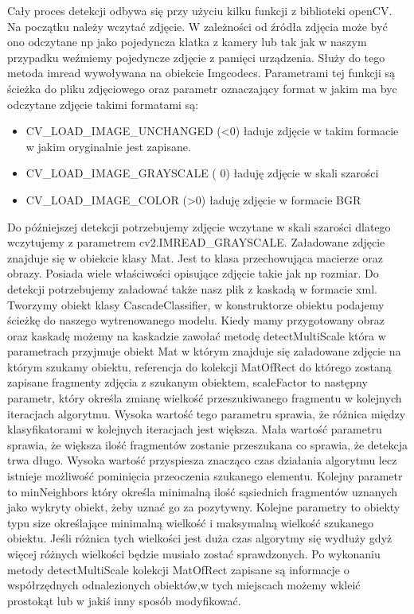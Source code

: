 Cały proces detekcji odbywa się przy użyciu kilku funkcji z biblioteki openCV. Na początku należy wczytać zdjęcie. W zależności od źródła zdjęcia może być ono odczytane np jako pojedyncza klatka z kamery lub tak jak w naszym przypadku weźmiemy pojedyncze zdjęcie z pamięci urządzenia. Służy do tego metoda imread wywoływana na obiekcie Imgcodecs. Parametrami tej funkcji są ścieżka do pliku zdjęciowego oraz parametr oznaczający format w jakim ma byc odczytane zdjęcie takimi formatami są:
\begin{itemize}
    \item CV\_LOAD\_IMAGE\_UNCHANGED (\textless0) ładuje zdjęcie w takim formacie w jakim oryginalnie jest zapisane.
    \item CV\_LOAD\_IMAGE\_GRAYSCALE ( 0) ładuję zdjęcie w skali szarości
    \item CV\_LOAD\_IMAGE\_COLOR (\textgreater0) ładuję zdjęcie w formacie BGR
\end{itemize}
Do późniejszej detekcji potrzebujemy zdjęcie wczytane w skali szarości dlatego wczytujemy z parametrem cv2.IMREAD\_GRAYSCALE.
Załadowane zdjęcie znajduje się w obiekcie klasy Mat. Jest to klasa przechowująca macierze oraz obrazy. Posiada wiele właściwości opisujące zdjęcie takie jak np rozmiar.
Do detekcji potrzebujemy załadować także nasz plik z kaskadą w formacie xml. Tworzymy obiekt klasy CascadeClassifier, w konstruktorze obiektu podajemy ścieżkę do naszego wytrenowanego modelu. Kiedy mamy przygotowany obraz oraz kaskadę możemy na kaskadzie zawołać metodę detectMultiScale która w parametrach przyjmuje obiekt Mat w którym znajduje się załadowane zdjęcie na którym szukamy obiektu, referencja do kolekcji MatOfRect do którego zostaną zapisane fragmenty zdjęcia z szukanym obiektem, scaleFactor to następny parametr, który określa zmianę wielkość przeszukiwanego fragmentu w kolejnych iteracjach algorytmu. Wysoka wartość tego parametru sprawia, że różnica między klasyfikatorami w kolejnych iteracjach jest większa. Mała wartość parametru sprawia, że większa ilość fragmentów zostanie przeszukana co sprawia, że detekcja trwa długo. Wysoka wartość przyspiesza znacząco czas działania algorytmu lecz istnieje możliwość pominięcia przeoczenia szukanego elementu. Kolejny parametr to minNeighbors który określa minimalną ilość sąsiednich fragmentów uznanych jako wykryty obiekt, żeby uznać go za pozytywny. Kolejne parametry to obiekty typu size określające minimalną wielkość i maksymalną wielkość szukanego obiektu. Jeśli różnica tych wielkości jest duża czas algorytmy się wydłuży gdyż więcej różnych wielkości będzie musiało zostać sprawdzonych. 
Po wykonaniu metody detectMultiScale kolekcji MatOfRect zapisane są informacje o współrzędnych odnalezionych obiektów,w tych miejscach możemy wkleić prostokąt lub w jakiś inny sposób modyfikować.
